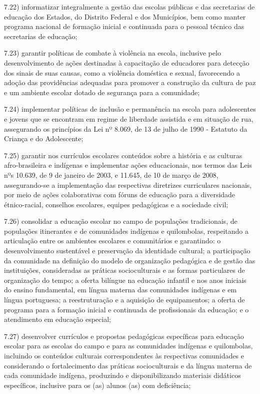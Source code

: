 \documentclass[
]{book}
\begin{document}
7.22) informatizar integralmente a gestão das escolas públicas e das secretarias de educação dos Estados, do Distrito Federal e dos Municípios, bem como manter programa nacional de formação inicial e continuada para o pessoal técnico das secretarias de educação;

7.23) garantir políticas de combate à violência na escola, inclusive pelo desenvolvimento de ações destinadas à capacitação de educadores para detecção dos sinais de suas causas, como a violência doméstica e sexual, favorecendo a adoção das providências adequadas para promover a construção da cultura de paz e um ambiente escolar dotado de segurança para a comunidade;

7.24) implementar políticas de inclusão e permanência na escola para adolescentes e jovens que se encontram em regime de liberdade assistida e em situação de rua, assegurando os princípios da Lei nº 8.069, de 13 de julho de 1990 - Estatuto da Criança e do Adolescente;

7.25) garantir nos currículos escolares conteúdos sobre a história e as culturas afro-brasileira e indígenas e implementar ações educacionais, nos termos das Leis nºs 10.639, de 9 de janeiro de 2003, e 11.645, de 10 de março de 2008, assegurando-se a implementação das respectivas diretrizes curriculares nacionais, por meio de ações colaborativas com fóruns de educação para a diversidade étnico-racial, conselhos escolares, equipes pedagógicas e a sociedade civil;

7.26) consolidar a educação escolar no campo de populações tradicionais, de populações itinerantes e de comunidades indígenas e quilombolas, respeitando a articulação entre os ambientes escolares e comunitários e garantindo: o desenvolvimento sustentável e preservação da identidade cultural; a participação da comunidade na definição do modelo de organização pedagógica e de gestão das instituições, consideradas as práticas socioculturais e as formas particulares de organização do tempo; a oferta bilíngue na educação infantil e nos anos iniciais do ensino fundamental, em língua materna das comunidades indígenas e em língua portuguesa; a reestruturação e a aquisição de equipamentos; a oferta de programa para a formação inicial e continuada de profissionais da educação; e o atendimento em educação especial;

7.27) desenvolver currículos e propostas pedagógicas específicas para educação escolar para as escolas do campo e para as comunidades indígenas e quilombolas, incluindo os conteúdos culturais correspondentes às respectivas comunidades e considerando o fortalecimento das práticas socioculturais e da língua materna de cada comunidade indígena, produzindo e disponibilizando materiais didáticos específicos, inclusive para os (as) alunos (as) com deficiência;
\end{document}
